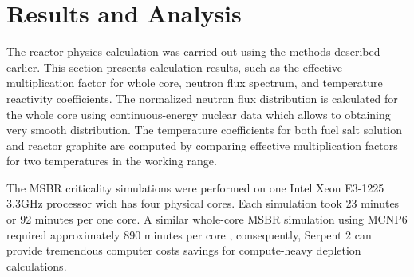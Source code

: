 \documentclass{anstrans}
\begin{document}
\section{Results and Analysis}
The reactor physics calculation was carried out using the methods described earlier. This section presents calculation results, such as the effective multiplication factor for whole core, neutron flux spectrum, and temperature reactivity coefficients. The normalized neutron flux distribution is calculated for the whole core using continuous-energy nuclear data which allows to obtaining very smooth distribution. The temperature coefficients for both fuel salt solution and reactor graphite are computed by comparing effective multiplication factors for two temperatures in the working range.

The MSBR criticality simulations were performed on one Intel Xeon E3-1225 3.3GHz processor wich has four physical cores. Each simulation took 23 minutes or 92 minutes per one core. A similar whole-core MSBR simulation using MCNP6 required approximately 890 minutes per core \cite{park_whole_2015}, consequently, Serpent 2 can provide tremendous computer costs savings for compute-heavy depletion calculations.
\end{document}
